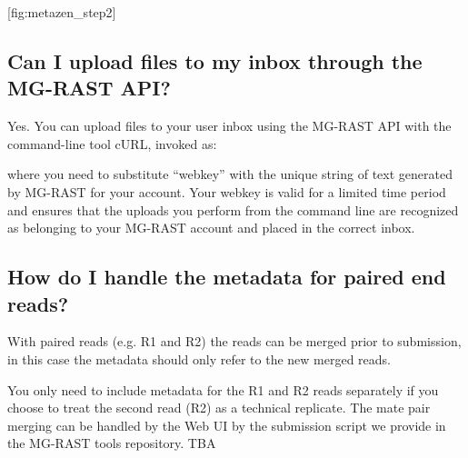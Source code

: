 \documentclass[letterpaper,10pt,english]{sphinxmanual}
\begin{document}
{[}fig:metazen\_step2{]}


\subsection{Can I upload files to my inbox through the MG-RAST API?}
\label{\detokenize{user_manual:can-i-upload-files-to-my-inbox-through-the-mg-rast-api}}
Yes. You can upload files to your user inbox using the MG-RAST API with
the command-line tool cURL, invoked as:

\begin{sphinxVerbatim}[commandchars=\\\{\}]
      
            
\end{sphinxVerbatim}

where you need to substitute “webkey” with the unique string of text
generated by MG-RAST for your account. Your webkey is valid for a
limited time period and ensures that the uploads you perform from the
command line are recognized as belonging to your MG-RAST account and
placed in the correct inbox.


\subsection{How do I handle the metadata for paired end reads?}
\label{\detokenize{user_manual:how-do-i-handle-the-metadata-for-paired-end-reads}}
With paired reads (e.g. R1 and R2) the reads can be merged prior to
submission, in this case the metadata should only refer to the new
merged reads.

You only need to include metadata for the R1 and R2 reads separately if
you choose to treat the second read (R2) as a technical replicate. The
mate pair merging can be handled by the Web UI by the submission script
we provide in the MG-RAST tools repository. TBA
\end{document}
